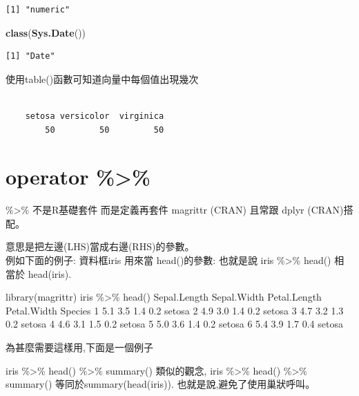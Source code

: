\documentclass[]{book}
\newenvironment{Shaded}{\begin{snugshade}}{\end{snugshade}}
\newcommand{\CommentTok}[1]{\textcolor[rgb]{0.56,0.35,0.01}{\textit{#1}}}
\newcommand{\KeywordTok}[1]{\textcolor[rgb]{0.13,0.29,0.53}{\textbf{#1}}}
\newcommand{\NormalTok}[1]{#1}
\newcommand{\OperatorTok}[1]{\textcolor[rgb]{0.81,0.36,0.00}{\textbf{#1}}}
\theoremstyle{definition}
\theoremstyle{definition}
\theoremstyle{definition}
\theoremstyle{remark}
\begin{document}
\begin{verbatim}
[1] "numeric"
\end{verbatim}

\begin{Shaded}
\begin{Highlighting}[]
\KeywordTok{class}\NormalTok{(}\KeywordTok{Sys.Date}\NormalTok{())}
\end{Highlighting}
\end{Shaded}

\begin{verbatim}
[1] "Date"
\end{verbatim}

使用table()函數可知道向量中每個值出現幾次

\begin{Shaded}
\end{Shaded}

\begin{verbatim}

    setosa versicolor  virginica 
        50         50         50 
\end{verbatim}

\hypertarget{operator}{%
\section{operator \%\textgreater{}\%}\label{operator}}

\%\textgreater{}\% 不是R基礎套件 而是定義再套件 magrittr (CRAN) 且常跟
dplyr (CRAN)搭配。

意思是把左邊(LHS)當成右邊(RHS)的參數。\\
例如下面的例子: 資料框iris 用來當 head()的參數: 也就是說 iris
\%\textgreater{}\% head() 相當於 head(iris).

library(magrittr) iris \%\textgreater{}\% head() Sepal.Length
Sepal.Width Petal.Length Petal.Width Species 1 5.1 3.5 1.4 0.2 setosa 2
4.9 3.0 1.4 0.2 setosa 3 4.7 3.2 1.3 0.2 setosa 4 4.6 3.1 1.5 0.2 setosa
5 5.0 3.6 1.4 0.2 setosa 6 5.4 3.9 1.7 0.4 setosa

為甚麼需要這樣用,下面是一個例子

iris \%\textgreater{}\% head() \%\textgreater{}\% summary() 類似的觀念,
iris \%\textgreater{}\% head() \%\textgreater{}\% summary()
等同於summary(head(iris)). 也就是說,避免了使用巢狀呼叫。
\end{document}
